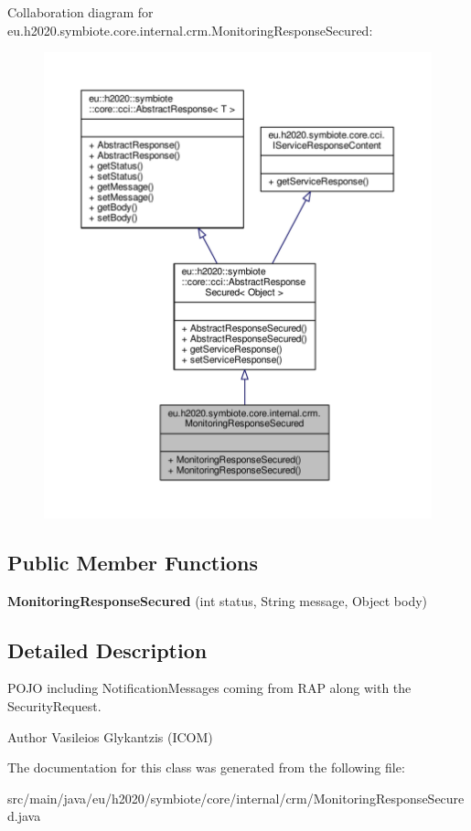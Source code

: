 Collaboration diagram for eu.\+h2020.\+symbiote.\+core.\+internal.\+crm.\+Monitoring\+Response\+Secured\+:
\nopagebreak
\begin{figure}[H]
\begin{center}
\leavevmode
\includegraphics[width=350pt]{classeu_1_1h2020_1_1symbiote_1_1core_1_1internal_1_1crm_1_1MonitoringResponseSecured__coll__graph}
\end{center}
\end{figure}
\subsection*{Public Member Functions}
\begin{DoxyCompactItemize}
\item 
\mbox{\label{classeu_1_1h2020_1_1symbiote_1_1core_1_1internal_1_1crm_1_1MonitoringResponseSecured_ab002921a1973672d90eb938c6f0070f2}} 
{\bfseries Monitoring\+Response\+Secured} (int status, String message, Object body)
\end{DoxyCompactItemize}


\subsection{Detailed Description}
P\+O\+JO including Notification\+Messages coming from R\+AP along with the Security\+Request. \begin{DoxyAuthor}{Author}
Vasileios Glykantzis (I\+C\+OM) 
\end{DoxyAuthor}


The documentation for this class was generated from the following file\+:\begin{DoxyCompactItemize}
\item 
src/main/java/eu/h2020/symbiote/core/internal/crm/Monitoring\+Response\+Secured.\+java\end{DoxyCompactItemize}
